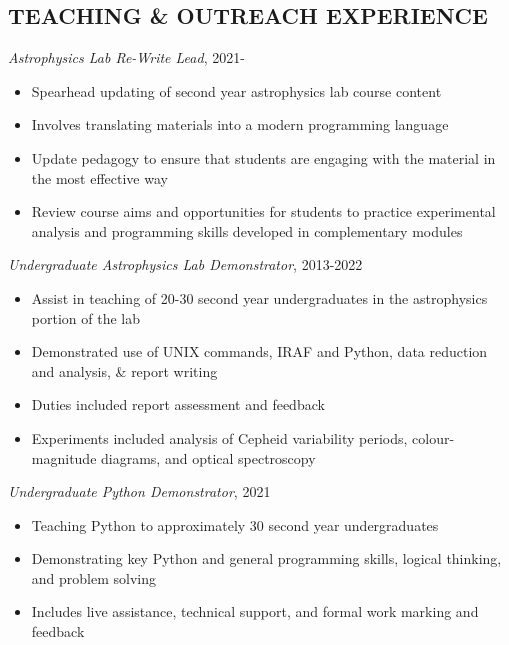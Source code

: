 \documentclass[letter, margin, 10pt]{res} %
\begin{document}
\begin{resume}
\section{TEACHING \& OUTREACH EXPERIENCE}

{\sl Astrophysics Lab Re-Write Lead}, 2021-
\begin{itemize}[noitemsep,topsep=0pt,parsep=0pt,partopsep=0pt]
\item Spearhead updating of second year astrophysics lab course content
\item Involves translating materials into a modern programming language
\item Update pedagogy to ensure that students are engaging with the material in the most effective way
\item Review course aims and opportunities for students to practice experimental analysis and programming skills developed in complementary modules
\end{itemize}

\vspace{-10pt}

{\sl Undergraduate Astrophysics Lab Demonstrator}, 2013-2022
\begin{itemize}[noitemsep,topsep=0pt,parsep=0pt,partopsep=0pt]
\item Assist in teaching of 20-30 second year undergraduates in the astrophysics portion of the lab
\item Demonstrated use of UNIX commands, IRAF and Python, data reduction and analysis, \& report writing
\item Duties included report assessment and feedback
\item Experiments included analysis of Cepheid variability periods, colour-magnitude diagrams, and optical spectroscopy
\end{itemize}

\vspace{-10pt}

{\sl Undergraduate Python Demonstrator}, 2021
\begin{itemize}[noitemsep,topsep=0pt,parsep=0pt,partopsep=0pt]
\item Teaching Python to approximately 30 second year undergraduates
\item Demonstrating key Python and general programming skills, logical thinking, and problem solving
\item Includes live assistance, technical support, and formal work marking and feedback
\end{itemize}


\end{resume}
\end{document}
